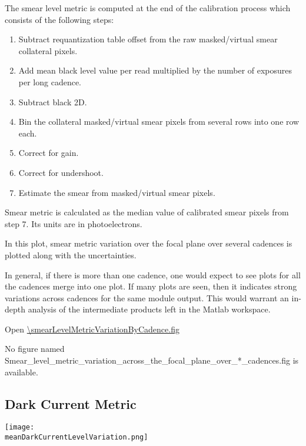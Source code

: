 The smear level metric is computed at the end of the calibration
process which consists of the following steps:

\begin{enumerate}
\item
  Subtract requantization table offset from the raw masked/virtual smear
  collateral pixels.
\item
  Add mean black level value per read multiplied by the number of
  exposures per long cadence.
\item
  Subtract black 2D.
\item
  Bin the collateral masked/virtual smear pixels from several rows into
  one row each.
\item
  Correct for gain.
\item
  Correct for undershoot.
\item
  Estimate the smear from masked/virtual smear pixels.
\end{enumerate}

Smear metric is calculated as the median value of calibrated smear
pixels from step 7. Its units are in photoelectrons.

In this plot, smear metric variation over the focal plane over several
cadences is plotted along with the uncertainties.

In general, if there is more than one cadence, one would expect to see
plots for all the cadences merge into one plot. If many plots are
seen, then it indicates strong variations across cadences for the same
module output. This would warrant an in-depth analysis of the
intermediate products left in the Matlab workspace.

Open \url{\smearLevelMetricVariationByCadence.fig}

\else
No figure named
Smear\_level\_metric\_variation\_across\_the\_focal\_plane\_over\_*\_cadences.fig is
available.
\fi
\clearpage

\subsection{Dark Current Metric}

\ifdefined \meanDarkCurrentLevelVariation

\begin{center}
  \texttt{[image: \\meanDarkCurrentLevelVariation.png]}
\end{center}

\meanDarkCurrentLevelVariationCaption

